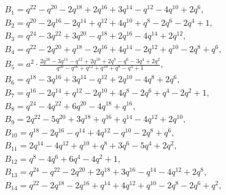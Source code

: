 \documentclass[10pt,a4paper]{amsart}
\numberwithin{equation}{section}
\theoremstyle{definition}
\newcommand{\flac}[2]{#1}
\begin{document}
\begin{gather*}
 B_1 =
\flac{q^{22}}{a^2}-\flac{q^{20}}{a^2}-\flac{2q^{18}}{a^2}+\flac{2q^{16}}{a^2}+\flac{3q^{14}}{a^2}-\flac{q^{12}}{a^2}-\flac{4q^{10}}{a^2}+\flac{2q^{6}}{a^2}, \\
 B_2 =
\flac{q^{20}}{a^2}-\flac{2q^{16}}{a^2}-\flac{2q^{14}}{a^2}+\flac{q^{12}}{a^2}+\flac{4q^{10}}{a^2}+\flac{q^{8}}{a^2}-\flac{2q^{6}}{a^2}-\flac{2q^{4}}{a^2}+\flac{1}{a^2}, \\
 B_3 =
\flac{q^{24}}{a^2}-\flac{3q^{22}}{a^2}+\flac{3q^{20}}{a^2}-\flac{q^{18}}{a^2}+\flac{2q^{16}}{a^2}-\flac{4q^{14}}{a^2}+\flac{2q^{12}}{a^2}, \\
 B_4 =
\flac{q^{22}}{a^2}-\flac{2q^{20}}{a^2}+\flac{q^{18}}{a^2}-\flac{2q^{16}}{a^2}+\flac{4q^{14}}{a^2}-\flac{2q^{12}}{a^2}+\flac{q^{10}}{a^2}-\flac{2q^{8}}{a^2}+\flac{q^{6}}{a^2}, \\
 B_5 =
a^2 \cdot \frac{2q^{16}-3q^{14}-q^{12}+2q^{10}+2q^{8}-q^{6}-3q^{4}+2q^{2}}{q^{20}-q^{16}+q^{12}+q^{10}+q^{8}-q^{4}+1}, \\
 B_6 =
\flac{q^{18}}{a^2}-\flac{3q^{16}}{a^2}+\flac{3q^{14}}{a^2}-\flac{q^{12}}{a^2}+\flac{2q^{10}}{a^2}-\flac{4q^{8}}{a^2}+\flac{2q^{6}}{a^2}, \\
 B_7 =
\flac{q^{16}}{a^2}-\flac{2q^{14}}{a^2}+\flac{q^{12}}{a^2}-\flac{2q^{10}}{a^2}+\flac{4q^{8}}{a^2}-\flac{2q^{6}}{a^2}+\flac{q^{4}}{a^2}-\flac{2q^{2}}{a^2}+\flac{1}{a^2}, \\
 B_8 =
\flac{q^{24}}{a^2}-\flac{4q^{22}}{a^2}+\flac{6q^{20}}{a^2}-\flac{4q^{18}}{a^2}+\flac{q^{16}}{a^2}, \\
 B_9 =
\flac{2q^{22}}{a^2}-\flac{5q^{20}}{a^2}+\flac{3q^{18}}{a^2}+\flac{q^{16}}{a^2}+\flac{q^{14}}{a^2}-\flac{4q^{12}}{a^2}+\flac{2q^{10}}{a^2}, \\
 B_{10} =
\flac{q^{18}}{a^2}-\flac{2q^{16}}{a^2}-\flac{q^{14}}{a^2}+\flac{4q^{12}}{a^2}-\flac{q^{10}}{a^2}-\flac{2q^{8}}{a^2}+\flac{q^{6}}{a^2}, \\
 B_{11} =
\flac{2q^{14}}{a^2}-\flac{4q^{12}}{a^2}+\flac{q^{10}}{a^2}+\flac{q^{8}}{a^2}+\flac{3q^{6}}{a^2}-\flac{5q^{4}}{a^2}+\flac{2q^{2}}{a^2}, \\
 B_{12} =
\flac{q^{8}}{a^2}-\flac{4q^{6}}{a^2}+\flac{6q^{4}}{a^2}-\flac{4q^{2}}{a^2}+\flac{1}{a^2}, \\
 B_{13} =
\flac{q^{24}}{a^2}-\flac{q^{22}}{a^2}-\flac{2q^{20}}{a^2}+\flac{2q^{18}}{a^2}+\flac{3q^{16}}{a^2}-\flac{q^{14}}{a^2}-\flac{4q^{12}}{a^2}+\flac{2q^{8}}{a^2}, \\
 B_{14} =
\flac{q^{22}}{a^2}-\flac{2q^{18}}{a^2}-\flac{2q^{16}}{a^2}+\flac{q^{14}}{a^2}+\flac{4q^{12}}{a^2}+\flac{q^{10}}{a^2}-\flac{2q^{8}}{a^2}-\flac{2q^{6}}{a^2}+\flac{q^{2}}{a^2}, \\

\end{gather*}
\end{document}
